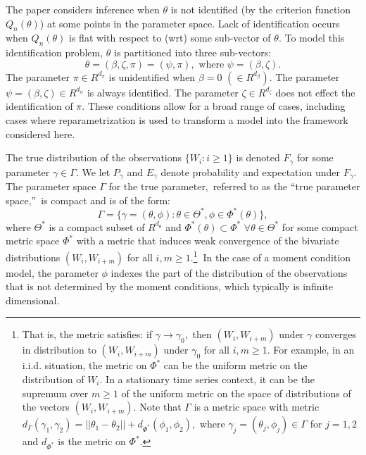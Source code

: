 \documentclass[12pt,titlepage,final,oneside,letterpaper]{article}
\begin{document}
The paper considers inference when $\theta $ is not identified (by the
criterion function $Q_{n}(\theta )$) at some points in the parameter space.
Lack of identification occurs when $Q_{n}(\theta )$ is flat with respect to
(wrt) some sub-vector of $\theta .$ To model this identification problem, $%
\theta $ is partitioned into three sub-vectors:%
\begin{equation}
\theta =(\beta ,\zeta ,\pi )=(\psi ,\pi ),\text{ where }\psi =(\beta ,\zeta
).
\end{equation}%
The parameter $\pi \in R^{d_{\pi }}$ is unidentified when $\beta =0$ $(\in
R^{d_{\beta }}).$ The parameter $\psi =(\beta ,\zeta )\in R^{d_{\psi }}$ is
always identified. The parameter $\zeta \in R^{d_{\zeta }}$ does not effect
the identification of $\pi .$ These conditions allow for a broad range of
cases, including cases where reparametrization is used to transform a model
into the framework considered here.

The true distribution of the observations $\{W_{i}:i\geq 1\}$ is denoted $%
F_{\gamma }$ for some parameter $\gamma \in \Gamma .$ We let $P_{\gamma }$
and $E_{\gamma }$ denote probability and expectation under $F_{\gamma }.$
The parameter space $\Gamma $ for the true parameter,\ referred to as the
\textquotedblleft true parameter space,\textquotedblright\ is compact and is
of the form:%
\begin{equation}
\Gamma =\{\gamma =(\theta ,\phi ):\theta \in \Theta ^{\ast },\phi \in \Phi
^{\ast }(\theta )\},  \label{True Par Space Gamma}
\end{equation}%
where $\Theta ^{\ast }$ is a compact subset of $R^{d_{\theta }}$ and $\Phi
^{\ast }(\theta )\subset \Phi ^{\ast }$ $\forall \theta \in \Theta ^{\ast }$
for some compact metric space $\Phi ^{\ast }$ with a metric that induces
weak convergence of the bivariate distributions $(W_{i},W_{i+m})$ for all $%
i,m\geq 1.$\footnote{%
That is, the metric satisfies: if $\gamma \rightarrow \gamma _{0},$ then $%
(W_{i},W_{i+m})$ under $\gamma $ converges in distribution to $%
(W_{i},W_{i+m})$ under $\gamma _{0}$ for all $i,m\geq 1.$ For example, in an
i.i.d. situation, the metric on $\Phi ^{\ast }$ can be the uniform metric on
the distribution of $W_{i}.$ In a stationary time series context, it can be
the supremum over $m\geq 1$ of the uniform metric on the space of
distributions of the vectors $(W_{i},W_{i+m}).$ Note that $\Gamma $ is a
metric space with metric $d_{\Gamma }(\gamma _{1},\gamma _{2})=||\theta
_{1}-\theta _{2}||+d_{\Phi ^{\ast }}(\phi _{1},\phi _{2}),$ where $\gamma
_{j}=(\theta _{j},\phi _{j})\in \Gamma $ for $j=1,2$ and $d_{\Phi ^{\ast }}$
is the metric on $\Phi ^{\ast }.$}\textbf{\ }In the case of a moment
condition model, the parameter $\phi $ indexes the part of the distribution
of the observations that is not determined by the moment conditions, which
typically is infinite dimensional.
\end{document}

